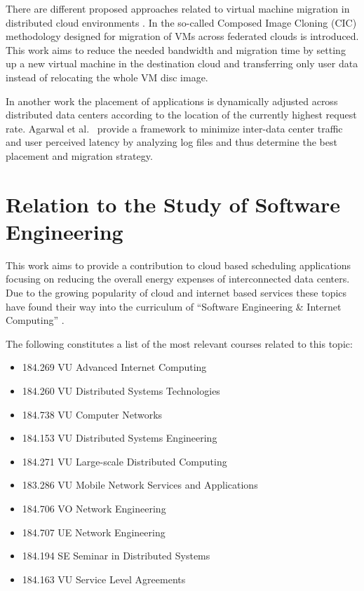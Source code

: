 \documentclass[a4paper]{article}
\begin{document}
There are different proposed approaches related to virtual machine migration in distributed cloud environments \cite{celesti2010improving, malet2010resource}. In \cite{celesti2010improving} the so-called Composed Image Cloning (CIC) methodology designed for migration of VMs across federated clouds is introduced. This work aims to reduce the needed bandwidth and migration time by setting up a new virtual machine in the destination cloud and transferring only user data instead of relocating the whole VM disc image. 

In another work \cite{malet2010resource} the placement of applications is dynamically adjusted across distributed data centers according to the location of the currently highest request rate. Agarwal et al.\ \cite{agarwal2010volley} provide a framework to minimize inter-data center traffic and user perceived latency by analyzing log files and thus determine the best placement and migration strategy. 


\section{Relation to the Study of Software Engineering}

This work aims to provide a contribution to cloud based scheduling applications focusing on reducing the overall energy expenses of interconnected data centers. Due to the growing popularity of cloud and internet based services these topics have found their way into the curriculum of ``Software Engineering \& Internet Computing'' \cite{curriculum2013curriculum}. 

The following constitutes a list of the most relevant courses related to this topic:


\begin{itemize}

\item{184.269 VU Advanced Internet Computing}
\item{184.260 VU Distributed Systems Technologies}
\item{184.738 VU Computer Networks}
\item{184.153 VU Distributed Systems Engineering}
\item{184.271 VU Large-scale Distributed Computing}
\item{183.286 VU Mobile Network Services and Applications}
\item{184.706 VO Network Engineering}
\item{184.707 UE Network Engineering}
\item{184.194 SE Seminar in Distributed Systems}
\item{184.163 VU Service Level Agreements }

\end{itemize}

\printbibliography
\end{document}
